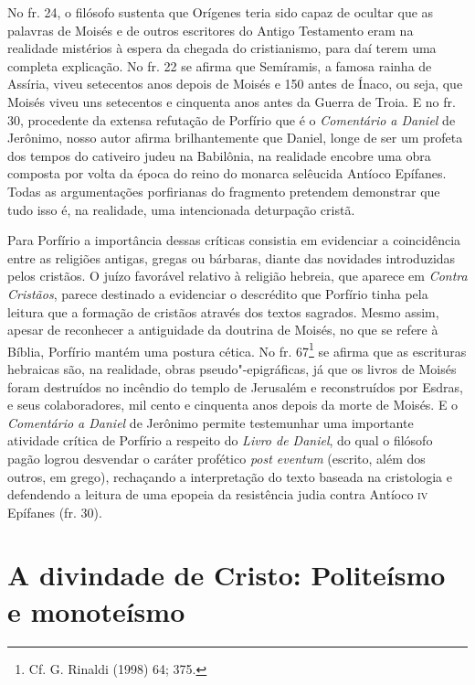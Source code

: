 No fr. 24, o filósofo sustenta que Orígenes teria sido capaz de ocultar
que as palavras de Moisés e de outros escritores do Antigo Testamento
eram na realidade mistérios à espera da chegada do cristianismo, para
daí terem uma completa explicação. No fr. 22 se afirma que Semíramis, a
famosa rainha de Assíria, viveu setecentos anos depois de Moisés e 150
antes de Ínaco, ou seja, que Moisés viveu uns setecentos e cinquenta
anos antes da Guerra de Troia. E no fr. 30, procedente da extensa
refutação de Porfírio que é o \textit{Comentário a Daniel} de Jerônimo,
nosso autor afirma brilhantemente que Daniel, longe de ser um profeta
dos tempos do cativeiro judeu na Babilônia, na realidade encobre uma
obra composta por volta da época do reino do monarca selêucida Antíoco
Epífanes. Todas as argumentações porfirianas do fragmento pretendem
demonstrar que tudo isso é, na realidade, uma intencionada deturpação
cristã.

Para Porfírio a importância dessas críticas consistia em evidenciar a
coincidência entre as religiões antigas, gregas ou bárbaras, diante das
novidades introduzidas pelos cristãos. O juízo favorável relativo à
religião hebreia, que aparece em \textit{Contra Cristãos}, parece
destinado a evidenciar o descrédito que Porfírio tinha pela leitura que
a formação de cristãos através dos textos sagrados. Mesmo assim, apesar
de reconhecer a antiguidade da doutrina de Moisés, no que se refere à
Bíblia, Porfírio mantém uma postura cética. No fr. 67\footnote{ Cf. G.
Rinaldi (1998) 64; 375.} se afirma que as escrituras hebraicas são, na
realidade, obras pseudo"-epigráficas, já que os livros de Moisés foram
destruídos no incêndio do templo de Jerusalém e reconstruídos por
Esdras, e seus colaboradores, mil cento e cinquenta anos depois da
morte de Moisés. E o \textit{Comentário a Daniel} de Jerônimo permite
testemunhar uma importante atividade crítica de Porfírio a respeito do
\textit{Livro de Daniel}, do qual o filósofo pagão logrou desvendar o
caráter profético \textit{post eventum }(escrito, além dos outros, em
grego), rechaçando a interpretação do texto baseada na cristologia e
defendendo a leitura de uma epopeia da resistência judia contra Antíoco
\textsc{iv} Epífanes (fr. 30).

\section{A divindade de Cristo: Politeísmo e monoteísmo}

